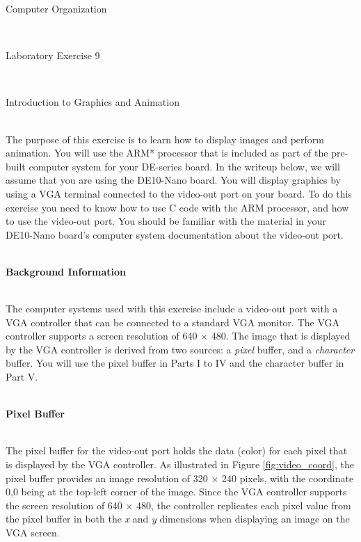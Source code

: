 \documentclass[epsfig,10pt,fullpage]{article}
\newcommand{\LabNum}{9}
\begin{document}
\centerline{\huge Computer Organization}
~\\
\centerline{\huge Laboratory Exercise \LabNum}
~\\
\centerline{\large Introduction to Graphics and Animation}
~\\

\noindent
The purpose of this exercise is to learn how to display images and perform animation. You will 
use the ARM* processor that is included as part of the pre-built computer system for your
DE-series board. In the writeup below, we will assume that you are using the DE10-Nano board. You
will display graphics by using a VGA terminal connected to the video-out port on your board. 
To do this exercise you need to know how to use C code with the ARM processor, and how to use 
the video-out port.  You should be familiar with the material in your DE10-Nano board's computer 
system documentation about the video-out port.

~\\
\noindent
{\bf Background Information}

~\\
The computer systems used with this exercise include a video-out port with a VGA controller 
that can be connected to a standard VGA monitor. The VGA controller supports a screen resolution of
640 $\times$ 480. The image that is displayed by the VGA controller is
derived from two sources: a {\it pixel} buffer, and a {\it character} buffer. You will use
the pixel buffer in Parts I to IV and the character buffer in Part V.

~\\
\noindent
{\bf Pixel Buffer}
\label{sec:pixel_buffer}

~\\
\noindent
The pixel buffer for the video-out port holds the data (color) for each pixel that is 
displayed by the VGA controller.  As illustrated in Figure \ref{fig:video_coord}, the
pixel buffer provides an image resolution of 320 $\times$ 240 pixels, with the coordinate 
0,0 being at the top-left corner of the image. Since the VGA controller supports the screen 
resolution of 640 $\times$ 480, the controller replicates each pixel value from the pixel 
buffer in both the {\it x} and {\it y} dimensions when displaying an image on the VGA screen.
\end{document}
